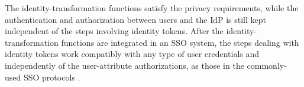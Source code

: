 The identity-transformation functions
        satisfy the privacy requirements,
    while the authentication and authorization between users and the IdP is still
    kept independent of the steps involving identity tokens.
After the identity-transformation functions are integrated in an SSO system,
    the steps dealing with identity tokens work compatibly with any type of user credentials
        and independently of the user-attribute authorizations,
        as those in the commonly-used SSO protocols \cite{OpenIDConnect,rfc6749,SAML,NIST2017draft}.


